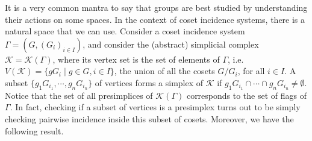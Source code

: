 \documentclass[11pt,letterpaper]{amsart}
\newcommand{\KK}{\mathcal{K}}
\begin{document}
It is a very common mantra to say that groups are best studied by understanding their actions on some spaces. In the context of coset incidence systems, there is a natural space that we can use. 
Consider a coset incidence system $\Gamma=(G,(G_i)_{i\in I})$, and consider the (abstract) simplicial complex $\KK=\KK(\Gamma)$, where its vertex set is the set of elements of $\Gamma$, i.e. $V(\KK)= \{gG_i\mid g\in G, i\in I\}$, the union of all the cosets $G/G_i$, for all $i\in I$.
A subset $\{g_1 G_{i_1}, \cdots, g_n G_{i_n} \}$ of vertices forms a simplex of $\mathcal{K}$ if $g_1 G_{i_1} \cap \cdots \cap g_n G_{i_n} \neq \emptyset$.
Notice that the set of all presimplices of $\KK(\Gamma)$ corresponds to the set of flags of $\Gamma$. In fact, checking if a subset of vertices is a presimplex turns out to be simply checking pairwise incidence inside this subset of cosets. Moreover, we have the following result.
\end{document}
